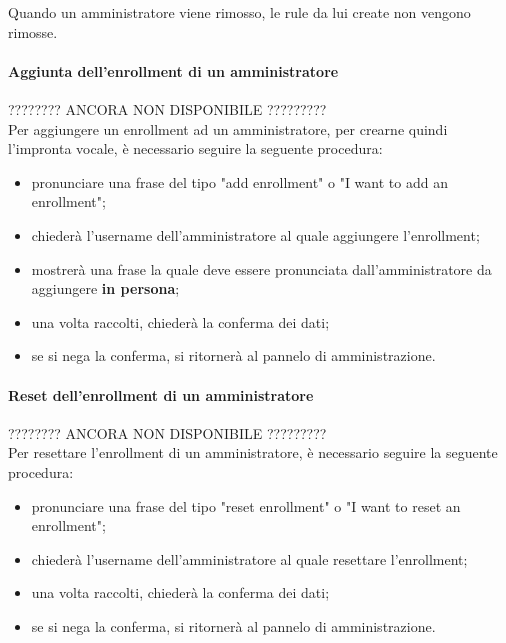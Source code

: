 Quando un amministratore viene rimosso, le rule da lui create non vengono rimosse.
\paragraph{Aggiunta dell'enrollment di un amministratore}\label{addEnrollment}
???????? ANCORA NON DISPONIBILE ?????????\\
Per aggiungere un enrollment ad un amministratore, per crearne quindi l'impronta vocale, è necessario seguire la seguente procedura:
\begin{itemize}
	\item pronunciare una frase del tipo "add enrollment" o "I want to add an enrollment";
	\item \PROGETTO{} chiederà l'username dell'amministratore al quale aggiungere l'enrollment;
	\item \PROGETTO{} mostrerà una frase la quale deve essere pronunciata dall'amministratore da aggiungere \textbf{in persona}; 
	\item una volta raccolti, \PROGETTO{} chiederà la conferma dei dati;
	\item se si nega la conferma, si ritornerà al pannelo di amministrazione.
\end{itemize}
\paragraph{Reset dell'enrollment di un amministratore}
???????? ANCORA NON DISPONIBILE ?????????\\
Per resettare l'enrollment di un amministratore, è necessario seguire la seguente procedura:
\begin{itemize}
	\item pronunciare una frase del tipo "reset enrollment" o "I want to reset an enrollment";
	\item \PROGETTO{} chiederà l'username dell'amministratore al quale resettare l'enrollment;
	\item una volta raccolti, \PROGETTO{} chiederà la conferma dei dati;
	\item se si nega la conferma, si ritornerà al pannelo di amministrazione.
\end{itemize}